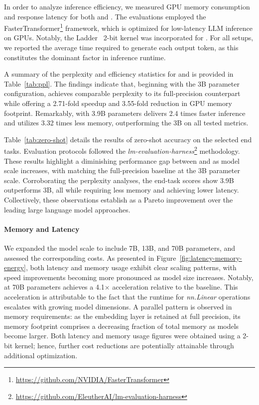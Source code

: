 In order to analyze inference efficiency, we measured GPU memory consumption and response latency for both  and . The evaluations employed the FasterTransformer\footnote{\url{https://github.com/NVIDIA/FasterTransformer}} framework, which is optimized for low-latency LLM inference on GPUs. Notably, the Ladder~\cite{ladder} 2-bit kernel was incorporated for . For all setups, we reported the average time required to generate each output token, as this constitutes the dominant factor in inference runtime.

A summary of the perplexity and efficiency statistics for  and  is provided in Table~\ref{tab:ppl}. The findings indicate that, beginning with the 3B parameter configuration,  achieves comparable perplexity to its full-precision  counterpart while offering a 2.71-fold speedup and 3.55-fold reduction in GPU memory footprint. Remarkably,  with 3.9B parameters delivers 2.4 times faster inference and utilizes 3.32 times less memory, outperforming the 3B  on all tested metrics.

Table~\ref{tab:zero-shot} details the results of zero-shot accuracy on the selected end tasks. Evaluation protocols followed the \emph{lm-evaluation-harness}\footnote{\url{https://github.com/EleutherAI/lm-evaluation-harness}} methodology. These results highlight a diminishing performance gap between  and  as model scale increases, with  matching the full-precision baseline at the 3B parameter scale. Corroborating the perplexity analyses, the end-task scores show  3.9B outperforms  3B, all while requiring less memory and achieving lower latency. Collectively, these observations establish  as a Pareto improvement over the leading large language model approaches.

\paragraph{Memory and Latency}

We expanded the model scale to include 7B, 13B, and 70B parameters, and assessed the corresponding costs. As presented in Figure~\ref{fig:latency-memory-energy}, both latency and memory usage exhibit clear scaling patterns, with speed improvements becoming more pronounced as model size increases. Notably,  at 70B parameters achieves a 4.1$\times$ acceleration relative to the  baseline. This acceleration is attributable to the fact that the runtime for \emph{nn.Linear} operations escalates with growing model dimensions. A parallel pattern is observed in memory requirements: as the embedding layer is retained at full precision, its memory footprint comprises a decreasing fraction of total memory as models become larger. Both latency and memory usage figures were obtained using a 2-bit kernel; hence, further cost reductions are potentially attainable through additional optimization.

